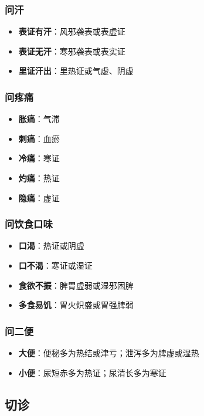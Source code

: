 \documentclass[12pt,UTF8]{ctexbook}
\begin{document}
\subsubsection{问汗}

\begin{itemize}
\item \textbf{表证有汗}：风邪袭表或表虚证
\item \textbf{表证无汗}：寒邪袭表或表实证
\item \textbf{里证汗出}：里热证或气虚、阴虚
\end{itemize}

\subsubsection{问疼痛}

\begin{itemize}
\item \textbf{胀痛}：气滞
\item \textbf{刺痛}：血瘀
\item \textbf{冷痛}：寒证
\item \textbf{灼痛}：热证
\item \textbf{隐痛}：虚证
\end{itemize}

\subsubsection{问饮食口味}

\begin{itemize}
\item \textbf{口渴}：热证或阴虚
\item \textbf{口不渴}：寒证或湿证
\item \textbf{食欲不振}：脾胃虚弱或湿邪困脾
\item \textbf{多食易饥}：胃火炽盛或胃强脾弱
\end{itemize}

\subsubsection{问二便}

\begin{itemize}
\item \textbf{大便}：便秘多为热结或津亏；泄泻多为脾虚或湿热
\item \textbf{小便}：尿短赤多为热证；尿清长多为寒证
\end{itemize}

\subsection{切诊}
\end{document}
